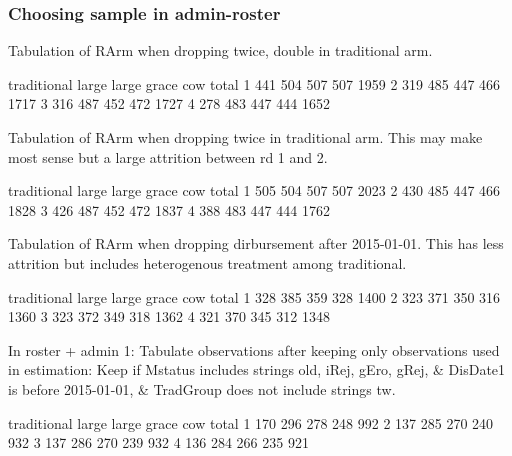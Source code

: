 \subsubsection{Choosing sample in admin-roster}

Tabulation of \textsf{RArm} when dropping \textsf{twice, double} in traditional arm.
\begin{Schunk}
\begin{Soutput}
  traditional large large grace cow total
1         441   504         507 507  1959
2         319   485         447 466  1717
3         316   487         452 472  1727
4         278   483         447 444  1652
\end{Soutput}
\end{Schunk}
Tabulation of \textsf{RArm} when dropping \textsf{twice} in traditional arm. This may make most sense but a large attrition between rd 1 and 2.
\begin{Schunk}
\begin{Soutput}
  traditional large large grace cow total
1         505   504         507 507  2023
2         430   485         447 466  1828
3         426   487         452 472  1837
4         388   483         447 444  1762
\end{Soutput}
\end{Schunk}
Tabulation of \textsf{RArm} when dropping dirbursement after 2015-01-01. This has less attrition but includes heterogenous treatment among traditional.
\begin{Schunk}
\begin{Soutput}
  traditional large large grace cow total
1         328   385         359 328  1400
2         323   371         350 316  1360
3         323   372         349 318  1362
4         321   370         345 312  1348
\end{Soutput}
\end{Schunk}
In \textsf{roster + admin} 1: Tabulate observations after keeping only observations used in estimation: Keep if \textsf{Mstatus} includes strings old, iRej, gEro, gRej, \& \textsf{DisDate1} is before 2015-01-01, \& \textsf{TradGroup} does not include strings tw.
\begin{Schunk}
\begin{Soutput}
  traditional large large grace cow total
1         170   296         278 248   992
2         137   285         270 240   932
3         137   286         270 239   932
4         136   284         266 235   921
\end{Soutput}
\end{Schunk}
